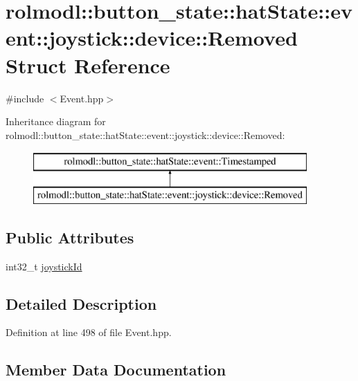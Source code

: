 \hypertarget{structrolmodl_1_1button__state_1_1hat_state_1_1event_1_1joystick_1_1device_1_1_removed}{}\section{rolmodl\+::button\+\_\+state\+::hat\+State\+::event\+::joystick\+::device\+::Removed Struct Reference}
\label{structrolmodl_1_1button__state_1_1hat_state_1_1event_1_1joystick_1_1device_1_1_removed}


{\ttfamily \#include $<$Event.\+hpp$>$}

Inheritance diagram for rolmodl\+::button\+\_\+state\+::hat\+State\+::event\+::joystick\+::device\+::Removed\+:\begin{figure}[H]
\begin{center}
\leavevmode
\includegraphics[height=2.000000cm]{structrolmodl_1_1button__state_1_1hat_state_1_1event_1_1joystick_1_1device_1_1_removed}
\end{center}
\end{figure}
\subsection*{Public Attributes}
\begin{DoxyCompactItemize}
\item 
int32\+\_\+t \mbox{\hyperlink{structrolmodl_1_1button__state_1_1hat_state_1_1event_1_1joystick_1_1device_1_1_removed_ad12daccc80764e21be8b6e236a31206a}{joystick\+Id}}
\end{DoxyCompactItemize}


\subsection{Detailed Description}


Definition at line 498 of file Event.\+hpp.



\subsection{Member Data Documentation}
\mbox{\label{structrolmodl_1_1button__state_1_1hat_state_1_1event_1_1joystick_1_1device_1_1_removed_ad12daccc80764e21be8b6e236a31206a}} 
